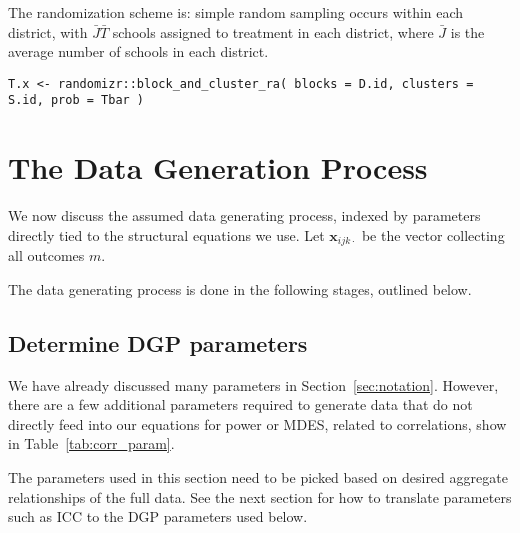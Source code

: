 \documentclass[12pt]{article}
\begin{document}
The randomization scheme is: simple random sampling occurs within each district, with $\bar{J} \bar{T}$ schools assigned to treatment in each district, where $\bar{J}$ is the average number of schools in each district.
\begin{verbatim}
T.x <- randomizr::block_and_cluster_ra( blocks = D.id, clusters = S.id, prob = Tbar )
\end{verbatim}



\newpage
\section{The Data Generation Process}

We now discuss the assumed data generating process, indexed by parameters directly tied to the structural equations we use.
Let $\boldsymbol{x}_{ijk\cdot}$ be the vector collecting all outcomes $m$.


The data generating process is done in the following stages, outlined below.

\subsection{Determine DGP parameters}
\label{sec:dgp_param}

We have already discussed many parameters in Section~\ref{sec:notation}.
However, there are a few additional parameters required to generate data that do not directly feed into our equations for power or MDES, related to correlations, show in Table~\ref{tab:corr_param}.

The parameters used in this section need to be picked based on desired aggregate relationships of the full data.
See the next section for how to translate parameters such as ICC to the DGP parameters used below.
\end{document}
